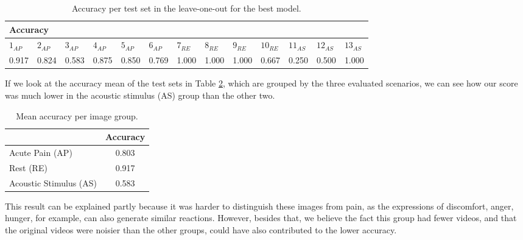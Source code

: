 \begin{table}[h!tp]
\setlength{\tabcolsep}{3.41pt}
\centering
\caption{Accuracy per test set in the leave-one-out for the best model.}
\label{tab:accuracy_leave_one_out}
\begin{tabular}{lllllllllllll}
\hline
\multicolumn{13}{l}{Accuracy}        \\ \hline
\multicolumn{1}{l|}{$1_{AP}$}  & \multicolumn{1}{l|}{$2_{AP}$}  & \multicolumn{1}{l|}{$3_{AP}$}  & \multicolumn{1}{l|}{$4_{AP}$}  & \multicolumn{1}{l|}{$5_{AP}$}  & \multicolumn{1}{l|}{$6_{AP}$}  & \multicolumn{1}{l|}{$7_{RE}$}  & \multicolumn{1}{l|}{$8_{RE}$}  & \multicolumn{1}{l|}{$9_{RE}$}  & \multicolumn{1}{l|}{$10_{RE}$} & \multicolumn{1}{l|}{$11_{AS}$} & \multicolumn{1}{l|}{$12_{AS}$} & $13_{AS}$ \\ \hline
\multicolumn{1}{l|}{0.917} & \multicolumn{1}{l|}{0.824} & \multicolumn{1}{l|}{0.583} & \multicolumn{1}{l|}{0.875} & \multicolumn{1}{l|}{0.850} & \multicolumn{1}{l|}{0.769} & \multicolumn{1}{l|}{1.000} & \multicolumn{1}{l|}{1.000} & \multicolumn{1}{l|}{1.000} & \multicolumn{1}{l|}{0.667} & \multicolumn{1}{l|}{0.250} & \multicolumn{1}{l|}{0.500} & 1.000 \\ \hline
\end{tabular}
\end{table}

If we look at the accuracy mean of the test sets in Table \ref{tab:mean_accuracy_group}, which are grouped by the three evaluated scenarios, we can see how our score was much lower in the acoustic stimulus (AS) group than the other two. 

\begin{table}[h!tp]
\centering
\caption{Mean accuracy per image group.}
\label{tab:mean_accuracy_group}
\begin{tabular}{lc}
\hline
                       & Accuracy \\ \hline
Acute Pain (AP)        & 0.803    \\
Rest (RE)              & 0.917    \\
Acoustic Stimulus (AS) & 0.583    \\ \hline
\end{tabular}
\end{table}

This result can be explained partly because it was harder to distinguish these images from pain, as the expressions of discomfort, anger, hunger, for example, can also generate similar reactions. However, besides that, we believe the fact this group had fewer videos, and that the original videos were noisier than the other groups, could have also contributed to the lower accuracy.

